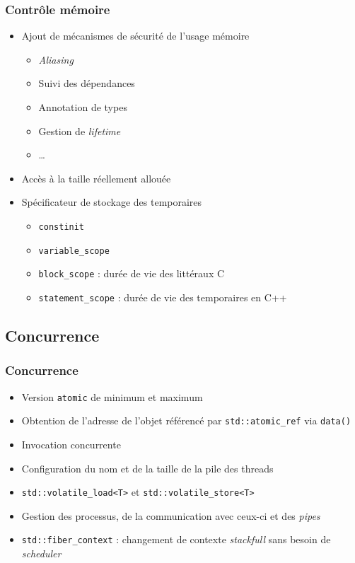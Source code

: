 \documentclass[C++.tex]{subfiles}
\begin{document}
\begin{frame}[fragile]
	\frametitle{Contrôle mémoire}
	\begin{itemize}
		\item Ajout de mécanismes de sécurité de l'usage mémoire


		\begin{itemize}
			\item \textit{Aliasing}
			\item Suivi des dépendances
			\item Annotation de types
			\item Gestion de \textit{lifetime}
			\item \ldots
		\end{itemize}

		\item Accès à la taille réellement allouée
		\item Spécificateur de stockage des temporaires 
		\begin{itemize}
			\item \lstinline|constinit|
			\item \lstinline|variable_scope|
			\item \lstinline|block_scope| : durée de vie des littéraux C
			\item \lstinline|statement_scope| : durée de vie des temporaires en C++
		\end{itemize}
	\end{itemize}
\end{frame}

\subsection*{Concurrence}
\begin{frame}[fragile]
	\frametitle{Concurrence}
	\begin{itemize}
		\item Version \lstinline|atomic| de minimum et maximum
		\item Obtention de l'adresse de l'objet référencé par \lstinline|std::atomic_ref| via \lstinline|data()|
		\item Invocation concurrente
		\item Configuration du nom et de la taille de la pile des threads
		\item \lstinline|std::volatile_load<T>| et \lstinline|std::volatile_store<T>|
		\item Gestion des processus, de la communication avec ceux-ci et des \textit{pipes}
		\item \lstinline|std::fiber_context| : changement de contexte \textit{stackfull} sans besoin de \textit{scheduler}
	\end{itemize}
\end{frame}
\end{document}
